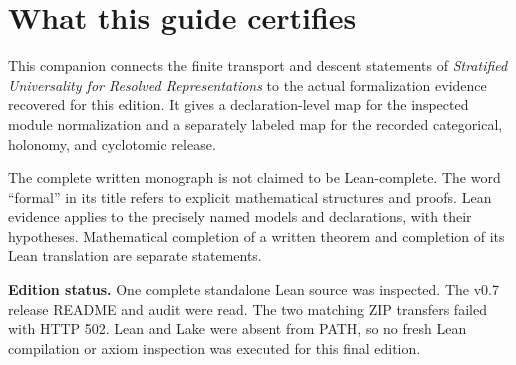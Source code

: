 \documentclass[11pt]{article}
\begin{document}
\KomorebiCover
{}

\hypersetup{pageanchor=false}

\hypersetup{pageanchor=true}
\begingroup\small\setlength{\parskip}{0pt}\tableofcontents\endgroup\clearpage

\section{What this guide certifies}
This companion connects the finite transport and descent statements of
\emph{Stratified Universality for Resolved Representations} to the actual
formalization evidence recovered for this edition. It gives a declaration-level
map for the inspected module normalization and a separately labeled map for
the recorded categorical, holonomy, and cyclotomic release.

The complete written monograph is not claimed to be Lean-complete. The word
``formal'' in its title refers to explicit mathematical structures and proofs.
Lean evidence applies to the precisely named models and declarations, with
their hypotheses. Mathematical completion of a written theorem and completion
of its Lean translation are separate statements.

\begin{scopebox}
\textbf{Edition status.} One complete standalone Lean source was inspected.
The v0.7 release README and audit were read. The two matching ZIP transfers
failed with HTTP 502. Lean and Lake were absent from PATH, so no fresh Lean
compilation or axiom inspection was executed for this final edition.
\end{scopebox}
\end{document}
